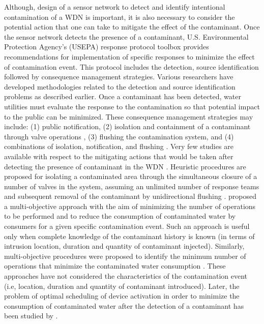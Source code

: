 \documentclass[authoryear,preprint,review,12pt]{elsarticle}
\begin{document}

Although, design of a sensor network to detect and identify intentional contamination of a WDN is important, it is also necessary to consider the potential action that one can take to mitigate the effect of the contaminant. Once the sensor network detects the presence of  a contaminant, U.S. Environmental Protection Agency's (USEPA) response protocol toolbox \citep{USEPA2004a} provides recommendations for implementation of specific responses to minimize the effect of contamination event. This protocol includes the detection, source identification followed by consequence management strategies. Various researchers have developed  methodologies related to the detection and source identification problems as described earlier. Once a contaminant has been detected, water utilities must evaluate the response to the contamination so that potential impact to the public can be minimized.  These consequence management strategies may include: (1) public notification, (2) isolation and containment of a contaminant through valve operations \citep{USEPA2004a}, (3) flushing the contamination system, and (4) combinations of isolation, notification, and flushing \citep{USEPA2004b}. Very few studies are available  with respect to the  mitigating actions that would be taken after detecting the presence of contaminant in the WDN \citep{Poulin2008-heuristic, Poulin-2010, Preis2008-Multiobjective,  Guidorzi2009-Amultiobjective, Alfonso2010-MultiobjectiveOptimization} . Heuristic  procedures are proposed   for isolating a contaminated area through the simultaneous closure of a number of valves in the system, assuming an unlimited number of response teams and subsequent removal of the contaminant by unidirectional
flushing \cite{Poulin2008-heuristic, Poulin-2010} . \cite{Preis2008-Multiobjective} proposed a multi-objective approach with the aim of minimizing the number of operations to be performed and to reduce the consumption of contaminated water by consumers for a given  specific contamination event. Such an approach is  useful only when complete knowledge of the contaminant history is known (in terms of intrusion location,  duration and quantity of contaminant injected). Similarly,   multi-objective procedures were proposed  to identify the minimum number of operations that minimize the contaminated water consumption \citep{Guidorzi2009-Amultiobjective, Alfonso2010-MultiobjectiveOptimization}.  These approaches \citep{Guidorzi2009-Amultiobjective, Alfonso2010-MultiobjectiveOptimization}  have not considered the characteristics of the contamination event (i.e, location, duration and quantity of contaminant introduced). Later,  the problem of optimal scheduling of device activation in order to minimize the consumption of contaminated water after the detection of a contaminant has been studied by \cite{Alvisi345-Nearoptimal}.
\end{document}
